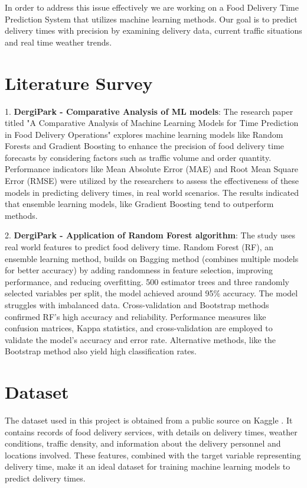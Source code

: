 \documentclass[10pt,twocolumn,letterpaper]{article}
\begin{document}
In order to address this issue effectively we are working on a Food Delivery Time Prediction System that utilizes machine learning methods. Our goal is to predict delivery times with precision by examining delivery data, current traffic situations and real time weather trends.

\section{Literature Survey}
1. \textbf{DergiPark - Comparative Analysis of ML models}: The research paper titled "A Comparative Analysis of Machine Learning Models for Time Prediction in Food Delivery Operations" explores machine learning models like Random Forests and Gradient Boosting to enhance the precision of food delivery time forecasts by considering factors such as traffic volume and order quantity. Performance indicators like Mean Absolute Error (MAE) and Root Mean Square Error (RMSE) were utilized by the researchers to assess the effectiveness of these models in predicting delivery times, in real world scenarios. The results indicated that ensemble learning models, like Gradient Boosting tend to outperform methods. \cite{dergipark1}

2. \textbf{DergiPark - Application of Random Forest algorithm}: The study uses real world features to predict food delivery time. Random Forest (RF), an ensemble learning method, builds on Bagging method (combines multiple models for better accuracy) by adding randomness in feature selection, improving performance, and reducing overfitting. 500 estimator trees and three randomly selected variables per split, the model achieved around 95\% accuracy. The model struggles with imbalanced data. Cross-validation and Bootstrap methods confirmed RF's high accuracy and reliability. Performance measures like confusion matrices, Kappa statistics, and cross-validation are employed to validate the model’s accuracy and error rate. Alternative methods, like the Bootstrap method also yield high classification rates. \cite{dergipark2}

\section{Dataset}
    The dataset used in this project is obtained from a public source on Kaggle \cite{kaggle}. It contains records of food delivery services, with details on delivery times, weather conditions, traffic density, and information about the delivery personnel and locations involved. These features, combined with the target variable representing delivery time, make it an ideal dataset for training machine learning models to predict delivery times.
\end{document}
